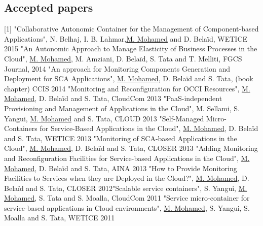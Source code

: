 \documentclass[11pt,a4paper,sans]{moderncv}   %
\begin{document}
\subsection{Accepted papers}
[1] "Collaborative Autonomic Container for the Management of Component-based Applications", N. Belhaj, I. B. Lahmar,\underline{M. Mohamed} and D. Bela\"id,  WETICE 2015 \newline
[2] "An Autonomic Approach to Manage Elasticity of Business Processes in the Cloud", \underline{M. Mohamed}, M. Amziani, D. Bela\"id, S. Tata and T. Melliti, FGCS Journal, 
2014 \newline
[3] "An approach for Monitoring Components Generation and Deployment for SCA Applications", \underline{M. Mohamed}, D. Bela\"id and S. Tata, (book chapter) CCIS 2014 \newline
[4] "Monitoring and Reconfiguration for OCCI Resources", \underline{M. Mohamed}, D. Bela\"id and S. Tata, CloudCom 2013 \newline
[5] "PaaS-independent Provisioning and Management of Applications in the Cloud", M. Sellami, S. Yangui, \underline{M. Mohamed} and S. Tata, CLOUD 2013 \newline
[6] "Self-Managed Micro-Containers for Service-Based Applications in the Cloud", \underline{M. Mohamed}, D. Bela\"id and S. Tata, WETICE 2013 \newline
[7] "Monitoring of SCA-based Applications in the Cloud", \underline{M. Mohamed}, D. Bela\"id and S. Tata, CLOSER 2013 \newline
[8] "Adding Monitoring and Reconfiguration Facilities for Service-based Applications in the Cloud", \underline{M. Mohamed}, D. Bela\"id and S. Tata, AINA 2013 \newline
[9] "How to Provide Monitoring Facilities to Services when they are Deployed in the Cloud?", \underline{M. Mohamed}, D. Bela\"id and S. Tata, CLOSER 2012\newline
[10] "Scalable service containers", S. Yangui, \underline{M. Mohamed}, S. Tata and S. Moalla,  CloudCom 2011 \newline
[11] "Service micro-container for service-based applications in Cloud environments", \underline{M. Mohamed}, S. Yangui, S. Moalla and S. Tata,  WETICE 2011\newline
\end{document}
